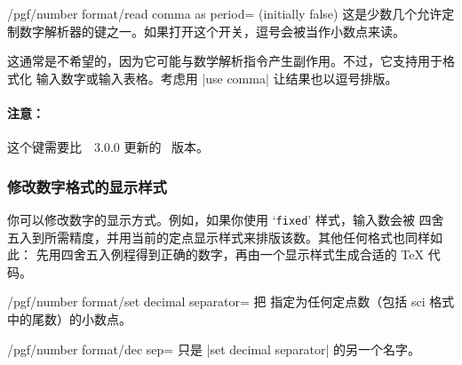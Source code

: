 \documentclass[a4paper,doc2]{ltxdoc}
\begin{document}
\begin{key}{/pgf/number format/read comma as period= (initially false)}
    这是少数几个允许定制数字解析器的键之一。如果打开这个开关，逗号会被当作小数点来读。
\begin{codeexample}[]
\end{codeexample}
    这通常是不希望的，因为它可能与数学解析指令产生副作用。不过，它支持用于格式化
    输入数字或输入表格。考虑用 |use comma| 让结果也以逗号排版。
\begin{codeexample}[]
\end{codeexample}

    \paragraph{注意：}

    这个键需要比~\pgfname~3.0.0 更新的 \pgfname\ 版本。
\end{key}


\subsubsection{修改数字格式的显示样式}%
\label{sec:number:styles}

你可以修改数字的显示方式。例如，如果你使用 `\texttt{fixed}' 样式，输入数会被
四舍五入到所需精度，并用当前的定点显示样式来排版该数。其他任何格式也同样如此：
先用四舍五入例程得到正确的数字，再由一个显示样式生成合适的 \TeX{} 代码。

\begin{key}{/pgf/number format/set decimal separator=}
    把  指定为任何定点数（包括 sci 格式中的尾数）的小数点。
\end{key}

\begin{key}{/pgf/number format/dec sep=}
    只是 |set decimal separator| 的另一个名字。
\end{key}
\end{document}
